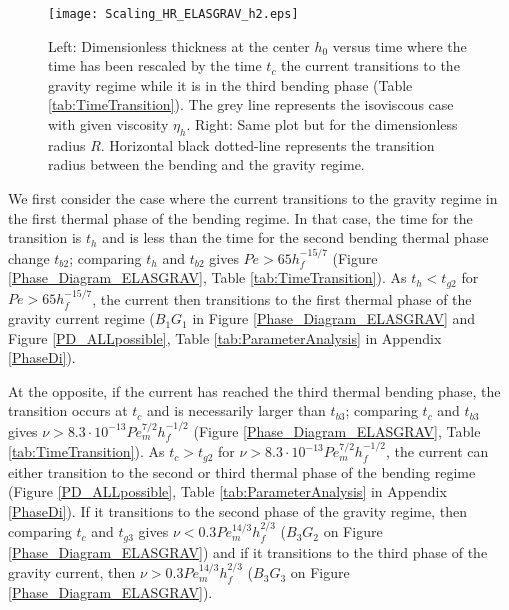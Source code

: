 \begin{figure}
  \begin{center}
    \graphicspath{ {/Users/thorey/Documents/These/Projet/Refroidissement/Skin_Model/Figure/JFM_V13/} }
    \texttt{[image: Scaling\_HR\_ELASGRAV\_h2.eps]}
    \caption{Left: Dimensionless thickness at  the center $h_0$ versus
      time where  the time  has been  rescaled by  the time  $t_c$ the
      current transitions  to the  gravity regime while  it is  in the
      third bending phase (Table \ref{tab:TimeTransition}).  The grey line represents the isoviscous
      case with  given viscosity $\eta_h$.   Right: Same plot  but for
      the  dimensionless  radius  $R$.  Horizontal  black  dotted-line
      represents  the transition  radius between  the bending  and the
      gravity regime.}
    \label{Scaling_HR_ELASGRAV_h2}
  \end{center}
\end{figure}

We  first consider  the  case  where the  current  transitions to  the
gravity regime  in the first thermal  phase of the bending  regime. In
that case, the time  for the transition is $t_h$ and  is less than the
time for the  second bending thermal phase  change $t_{b2}$; comparing
$t_h$    and    $t_{b2}$    gives    $Pe>65    h_f^{-15/7}$    (Figure
\ref{Phase_Diagram_ELASGRAV},  Table   \ref{tab:TimeTransition}).   As
$t_h<t_{g2}$ for $Pe>65 h_f^{-15/7}$,  the current then transitions to
the first  thermal phase  of the gravity  current regime  ($B_1G_1$ in
Figure  \ref{Phase_Diagram_ELASGRAV} and  Figure \ref{PD_ALLpossible},
Table \ref{tab:ParameterAnalysis} in Appendix \ref{PhaseDi}).

At the opposite, if the current  has reached the third thermal bending
phase, the transition  occurs at $t_c$ and is  necessarily larger than
$t_{b3}$;      comparing      $t_c$       and      $t_{b3}$      gives
$\nu   >   8.3   \cdot   10^{-13}   Pe_m^{7/2}   h_f^{-1/2}$   (Figure
\ref{Phase_Diagram_ELASGRAV},  Table   \ref{tab:TimeTransition}).   As
$t_c>t_{g2}$ for $\nu >  8.3\cdot 10^{-13} Pe_m^{7/2} h_f^{-1/2}$, the
current can either transition to the  second or third thermal phase of
the    bending    regime     (Figure    \ref{PD_ALLpossible},    Table
\ref{tab:ParameterAnalysis}   in  Appendix   \ref{PhaseDi}).   If   it
transitions to the second phase  of the gravity regime, then comparing
$t_c$ and  $t_{g3}$ gives $\nu  < 0.3Pe_m^{14/3} h_f^{2/3}$  ($B_3G_2$ on
Figure  \ref{Phase_Diagram_ELASGRAV}) and  if  it  transitions to  the
third phase of the gravity current, then $\nu > 0.3Pe_m^{14/3} h_f^{2/3}$
($B_3G_3$ on Figure \ref{Phase_Diagram_ELASGRAV}).

